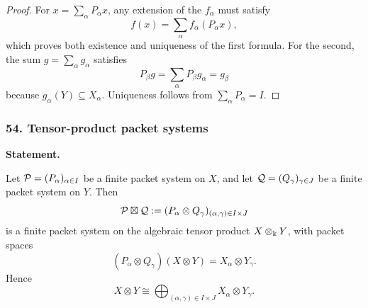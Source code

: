 \begin{proof}
For \(x=\sum_\alpha P_\alpha x\), any extension of the \(f_\alpha\) must satisfy
\[
f(x)=\sum_\alpha f_\alpha(P_\alpha x),
\]
which proves both existence and uniqueness of the first formula.  For the second, the sum \(g=\sum_\alpha g_\alpha\) satisfies
\[
P_\beta g
=\sum_\alpha P_\beta g_\alpha
=g_\beta
\]
because \(g_\alpha(Y)\subseteq X_\alpha\).  Uniqueness follows from \(\sum_\alpha P_\alpha=I\).
\end{proof}
\subsubsection*{54. Tensor-product packet systems}
\label{rec:PSC-I-T-TENSOR-PACKET-SYSTEM}
\textbf{Statement.}\par
Let \(\mathcal P=(P_\alpha)_{\alpha\in I}\) be a finite packet system on \(X\), and let \(\mathcal Q=(Q_\gamma)_{\gamma\in J}\) be a finite packet system on \(Y\).  Then
\[
\mathcal P\boxtimes\mathcal Q
:=
(P_\alpha\otimes Q_\gamma)_{(\alpha,\gamma)\in I\times J}
\]
is a finite packet system on the algebraic tensor product \(X\otimes_{\Bbbk}Y\), with packet spaces
\[
(P_\alpha\otimes Q_\gamma)(X\otimes Y)
=X_\alpha\otimes Y_\gamma.
\]
Hence
\[
\boxed{
X\otimes Y
\cong
\bigoplus_{(\alpha,\gamma)\in I\times J}
X_\alpha\otimes Y_\gamma.
}
\]

